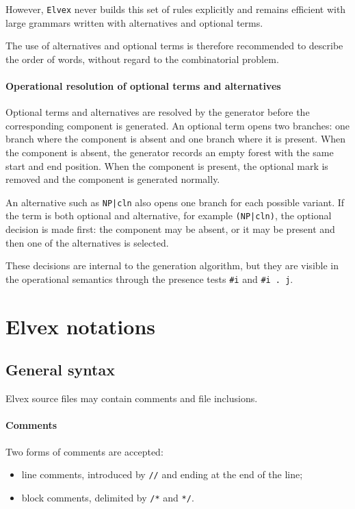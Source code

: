 \documentclass[11pt]{article}
\begin{document}
However, \texttt{Elvex} never builds this set of rules explicitly and
remains efficient with large grammars written with alternatives and
optional terms.

The use of alternatives and optional terms is therefore recommended to
describe the order of words, without regard to the combinatorial
problem.

\paragraph{Operational resolution of optional terms and alternatives}

Optional terms and alternatives are resolved by the generator before the
corresponding component is generated.  An optional term opens two branches:
one branch where the component is absent and one branch where it is present.
When the component is absent, the generator records an empty forest with the
same start and end position. When the component is present, the optional mark
is removed and the component is generated normally.

An alternative such as \verb#NP|cln# also opens one branch for each possible
variant. If the term is both optional and alternative, for example
\verb#(NP|cln)#, the optional decision is made first: the component may be
absent, or it may be present and then one of the alternatives is selected.

These decisions are internal to the generation algorithm, but they are visible
in the operational semantics through the presence tests \verb|#i| and
\verb|#i . j|.

\section{Elvex notations}


\subsection{General syntax}

Elvex source files may contain comments and file inclusions.

\paragraph{Comments}

Two forms of comments are accepted:

\begin{itemize}
	\item line comments, introduced by \verb#//# and ending at the end of the line;
	\item block comments, delimited by \verb#/*# and \verb#*/#.
\end{itemize}
\end{document}
